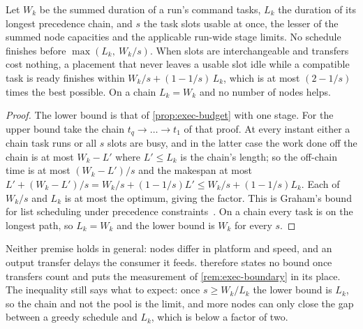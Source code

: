 \begin{proposition}
\label{prop:exec-graham}
Let $W_k$ be the summed duration of a run's command tasks, $L_k$ the duration
of its longest precedence chain, and $s$ the task slots usable at once, the
lesser of the summed node capacities and the applicable run-wide stage
limits. No schedule finishes before $\max(L_k,\ W_k/s)$. When slots are
interchangeable and transfers cost nothing, a placement that never leaves a
usable slot idle while a compatible task is ready finishes within $W_k/s +
(1 - 1/s)\,L_k$, which is at most $(2 - 1/s)$ times the best possible. On a
chain $L_k = W_k$ and no number of nodes helps.
\end{proposition}

\begin{proof}
The lower bound is that of \cref{prop:exec-budget} with one stage. For the
upper bound take the chain $t_q \to \dots \to t_1$ of that proof. At every
instant either a chain task runs or all $s$ slots are busy, and in the latter
case the work done off the chain is at most $W_k - L'$ where $L' \le L_k$ is
the chain's length; so the off-chain time is at most $(W_k - L')/s$ and the
makespan at most $L' + (W_k - L')/s = W_k/s + (1 - 1/s)L' \le W_k/s + (1 -
1/s)L_k$. Each of $W_k/s$ and $L_k$ is at most the optimum, giving the factor.
This is Graham's bound for list scheduling under precedence
constraints~\cite{graham66,graham69}. On a chain every task is on the
longest path, so $L_k = W_k$ and the lower bound is $W_k$ for every $s$.
\end{proof}

Neither premise holds in general: nodes differ in platform and speed, and an
output transfer delays the consumer it feeds.  therefore states no
bound once transfers count and puts the measurement of
\cref{rem:exec-boundary} in its place. The inequality still says what to
expect: once $s \ge W_k/L_k$ the lower bound is $L_k$, so the chain and not the
pool is the limit, and more nodes can only close the gap between a greedy
schedule and $L_k$, which is below a factor of two.

